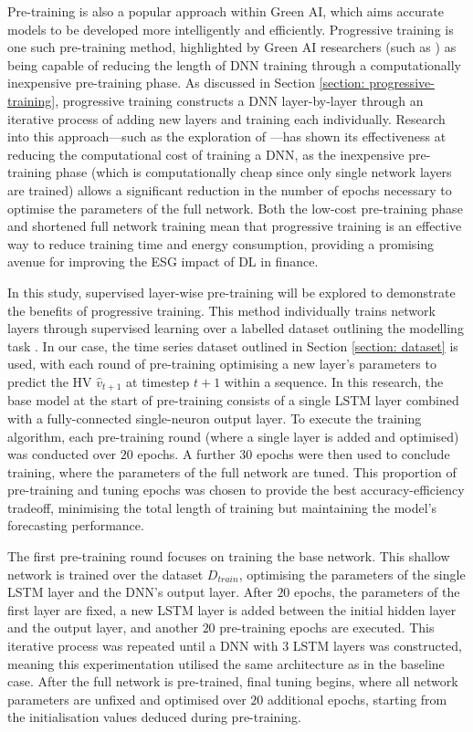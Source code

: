 \documentclass[a4paper, 11pt]{report}
\begin{document}
    Pre-training is also a popular approach within Green AI, which aims accurate models to be developed more intelligently and efficiently. Progressive training is one such pre-training method, highlighted by Green AI researchers (such as \citet{xu-2021}) as being capable of reducing the length of DNN training through a computationally inexpensive pre-training phase. As discussed in Section \ref{section: progressive-training}, progressive training constructs a DNN layer-by-layer through an iterative process of adding new layers and training each individually. Research into this approach---such as the exploration of \citet{ienco-2019}---has shown its effectiveness at reducing the computational cost of training a DNN, as the inexpensive pre-training phase (which is computationally cheap since only single network layers are trained) allows a significant reduction in the number of epochs necessary to optimise the parameters of the full network. Both the low-cost pre-training phase and shortened full network training mean that progressive training is an effective way to reduce training time and energy consumption, providing a promising avenue for improving the ESG impact of DL in finance.

    In this study, supervised layer-wise pre-training will be explored to demonstrate the benefits of progressive training. This method individually trains network layers through supervised learning over a labelled dataset outlining the modelling task \citep{ienco-2019}. In our case, the time series dataset outlined in Section \ref{section: dataset} is used, with each round of pre-training optimising a new layer's parameters to predict the HV $\hat{v}_{t+1}$ at timestep $t+1$ within a sequence. In this research, the base model at the start of pre-training consists of a single LSTM layer combined with a fully-connected single-neuron output layer. To execute the training algorithm, each pre-training round (where a single layer is added and optimised) was conducted over $20$ epochs. A further $30$ epochs were then used to conclude training, where the parameters of the full network are tuned. This proportion of pre-training and tuning epochs was chosen  to provide the best accuracy-efficiency tradeoff, minimising the total length of training but maintaining the model's forecasting performance. 

    The first pre-training round focuses on training the base network. This shallow network is trained over the dataset $D_{train}$, optimising the parameters of the single LSTM layer and the DNN's output layer. After $20$ epochs, the parameters of the first layer are fixed, a new LSTM layer is added between the initial hidden layer and the output layer, and another $20$ pre-training epochs are executed. This iterative process was repeated until a DNN with $3$ LSTM layers was constructed, meaning this experimentation utilised the same architecture as in the baseline case. After the full network is pre-trained, final tuning begins, where all network parameters are unfixed and optimised over $20$ additional epochs, starting from the initialisation values deduced during pre-training.
\end{document}
